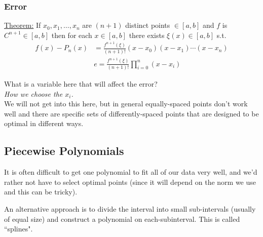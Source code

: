 \documentclass[12pt]{article}
\begin{document}
\subsubsection*{Error}
\underline{Theorem:} If $x_0, x_1,\dots, x_n$ are $(n+1)$ distinct points $\in [a,b]$ and $f$ is $C^{n+1} \in [a,b]$ then for each $x\in [a,b]$ there exists $\xi(x) \in [a,b]$ s.t.
\begin{align}
f(x) - P_n(x)& = \frac{f^{n+1}(\xi)}{(n+1)!}(x-x_0)(x-x_1)\cdots(x-x_n)\nonumber \\
&\boxed{e = \frac{f^{n+1}(\xi)}{(n+1)!}\prod_{i=0}^n (x-x_i)}\nonumber
\end{align}
%
%

What is a variable here that will affect the error? \\ \textit{How we choose the $x_i$.} \\We will not get into this here, but in general equally-spaced points don't work well and there are specific sets of differently-spaced points that are designed to be optimal in different ways. 

\subsection*{Piecewise Polynomials}

It is often difficult to get one polynomial to fit all of our data very well, and we'd rather not have to select optimal points (since it will depend on the norm we use and this can be tricky). 

An alternative approach is to divide the interval into small sub-intervals (usually of equal size) and construct a polynomial on each-subinterval. This is called ``splines".
\end{document}
